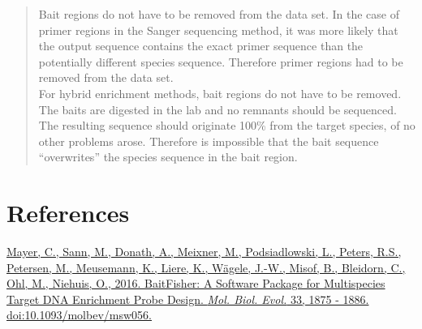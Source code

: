 \documentclass[a4paper,pdflatex,11pt]{article}
\begin{document}
\begin{quote}
Bait regions do not have to be removed from the data set. In the case of
primer regions in the Sanger sequencing method, it was more likely that
the output sequence contains the exact primer sequence than the
potentially different species sequence. Therefore primer regions had to
be removed from the data set. \textbf{\\
}For hybrid enrichment methods, bait regions do not have to be removed.
The baits are digested in the lab and no remnants should be sequenced.
The resulting sequence should originate 100\% from the target species,
of no other problems arose. Therefore is impossible that the bait
sequence ``overwrites'' the species sequence in the bait region.
\end{quote}

\section{References}

\href{https://academic.oup.com/mbe/article/33/7/1875/2579186/BaitFisher-A-Software-Package-for-Multispecies}
{Mayer, C., Sann, M., Donath, A., Meixner, M., Podsiadlowski, L., Peters,
R.S., Petersen, M., Meusemann, K., Liere, K., Wägele, J.-W., Misof, B.,
Bleidorn, C., Ohl, M., Niehuis, O., 2016. BaitFisher: A Software Package for
Multispecies Target DNA Enrichment Probe Design. \emph{Mol. Biol. Evol.} 33, 1875 - 1886.
doi:10.1093/molbev/msw056.}

\end{document}
